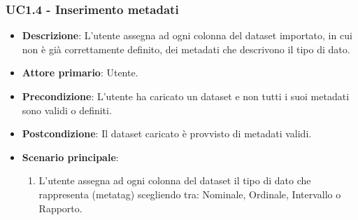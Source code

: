 \subsubsection{UC1.4 - Inserimento metadati}
\label{ssub:uc1.4}
\begin{itemize}
    \item \textbf{Descrizione}: L'utente assegna ad ogni colonna del dataset importato,
                                in cui non è già correttamente definito,
                                dei metadati che descrivono il tipo di dato.


    \item \textbf{Attore primario}: Utente.
    
    \item \textbf{Precondizione}:   L'utente ha caricato un dataset e non tutti i suoi metadati sono validi o definiti.
    \item \textbf{Postcondizione}:  Il dataset caricato è provvisto di metadati validi. 

	\item \textbf{Scenario principale}:
		\begin{enumerate}
            \item L'utente assegna ad ogni colonna del dataset il tipo di dato che rappresenta (metatag) scegliendo tra:
                    Nominale, Ordinale, Intervallo o Rapporto.
        \end{enumerate}

\end{itemize}

